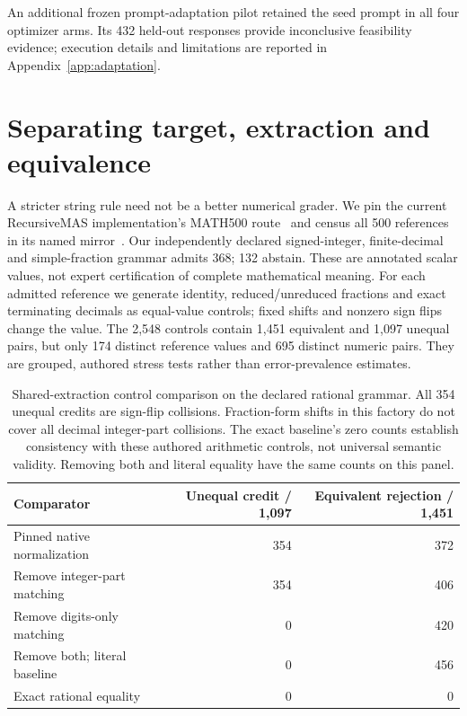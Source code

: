 An additional frozen prompt-adaptation pilot retained the seed prompt in all four optimizer arms. Its 432 held-out responses provide inconclusive feasibility evidence; execution details and limitations are reported in Appendix~\ref{app:adaptation}.

\section{Separating target, extraction and equivalence}\label{sec:grader-comparison}
A stricter string rule need not be a better numerical grader. We pin the current RecursiveMAS implementation's MATH500 route~\cite{recursivemas,recursivecode} and census all 500 references in its named mirror~\cite{math500}. Our independently declared signed-integer, finite-decimal and simple-fraction grammar admits 368; 132 abstain. These are annotated scalar values, not expert certification of complete mathematical meaning. For each admitted reference we generate identity, reduced/unreduced fractions and exact terminating decimals as equal-value controls; fixed shifts and nonzero sign flips change the value. The 2,548 controls contain 1,451 equivalent and 1,097 unequal pairs, but only 174 distinct reference values and 695 distinct numeric pairs. They are grouped, authored stress tests rather than error-prevalence estimates.

\begin{table}[!ht]
\centering\small
\begin{tabular}{lrr}
\toprule
Comparator & Unequal credit / 1,097 & Equivalent rejection / 1,451\\
\midrule
Pinned native normalization & 354 & 372\\
Remove integer-part matching & 354 & 406\\
Remove digits-only matching & 0 & 420\\
Remove both; literal baseline & 0 & 456\\
Exact rational equality & 0 & 0\\
\bottomrule
\end{tabular}
\caption{Shared-extraction control comparison on the declared rational grammar. All 354 unequal credits are sign-flip collisions. Fraction-form shifts in this factory do not cover all decimal integer-part collisions. The exact baseline's zero counts establish consistency with these authored arithmetic controls, not universal semantic validity. Removing both and literal equality have the same counts on this panel.}
\label{tab:grader-controls}
\end{table}

